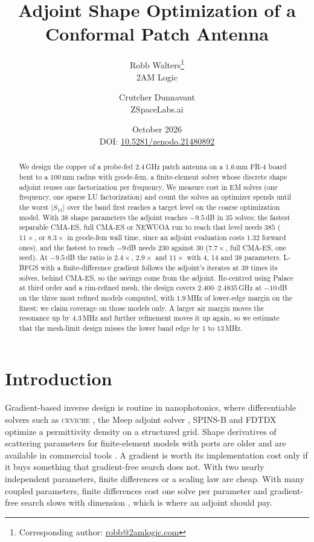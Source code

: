 \documentclass{anvil-paper}
\title{Adjoint Shape Optimization of a Conformal Patch Antenna}
\author{Robb Walters\thanks{Corresponding author: \href{mailto:robb@2amlogic.com}{robb@2amlogic.com}}\\
  {\normalsize 2AM Logic}
  \and Crutcher Dunnavant\\
  {\normalsize ZSpaceLabs.ai}}
\date{October 2026\\[0.5ex]
  {\normalsize DOI: \href{https://doi.org/10.5281/zenodo.21480892}{10.5281/zenodo.21480892}}}
\begin{document}
\maketitle

\begin{abstract}
We design the copper of a probe-fed 2.4\,GHz patch antenna on a $1.6$\,mm
FR-4 board bent to a $100$\,mm radius with geode-fem, a finite-element
solver whose discrete shape adjoint reuses one factorization per frequency.
We measure cost in EM solves (one frequency, one sparse LU factorization) and
count the solves an optimizer spends until the worst $|S_{11}|$ over the band
first reaches a target level on the coarse optimization model. With
38 shape parameters the adjoint reaches $-9.5$\,dB in $35$ solves; the fastest
separable CMA-ES, full CMA-ES or NEWUOA run to reach that level needs $385$
($11\times$, or $8.3\times$ in geode-fem wall time, since an adjoint
evaluation costs $1.32$ forward ones), and the fastest to reach $-9$\,dB needs
$230$ against $30$ ($7.7\times$, full CMA-ES, one seed). At $-9.5$\,dB the
ratio is $2.4\times$, $2.9\times$ and $11\times$ with 4, 14 and 38 parameters.
L-BFGS with a finite-difference gradient follows the adjoint's iterates at
$39$ times its solves, behind CMA-ES, so the savings come from the adjoint.
Re-centred using Palace at third order and a rim-refined mesh, the design
covers $2.400$--$2.4835$\,GHz at $-10$\,dB on the three most refined models
computed, with $1.9$\,MHz of lower-edge margin on the finest; we claim
coverage on those models only. A larger air margin moves the resonance up by
$4.3$\,MHz and further refinement moves it up again, so we estimate that the
mesh-limit design misses the lower band edge by $1$ to $13$\,MHz.
\end{abstract}

\section{Introduction}
\label{sec:intro}

Gradient-based inverse design is routine in nanophotonics, where
differentiable solvers such as \textsc{ceviche} \citep{hughes2019forward},
the Meep adjoint solver \citep{hammond2022meepadjoint}, SPINS-B
\citep{su_spinsb} and FDTDX \citep{mahlau2026fdtdx} optimize a permittivity
density on a structured grid. Shape derivatives of scattering parameters for
finite-element models with ports are older
\citep{webb2000design,georgieva2002feasible,nikolova2004adjoint} and are
available in commercial tools
\citep{ansys_hfss_derivatives,comsol_sensitivity_method}. A gradient is worth
its implementation cost only if it buys something that gradient-free search
does not. With two nearly independent parameters, finite differences or a
scaling law are cheap. With many coupled parameters, finite differences cost
one solve per parameter and gradient-free search slows with dimension
\citep{rios2013derivative}, which is where an adjoint should pay.
\end{document}
